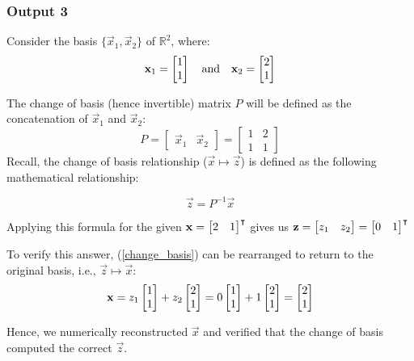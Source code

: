 \documentclass[10pt]{article}
\begin{document}
\subsubsection{Output 3}
Consider the basis $\{\vec{x}_1, \vec{x}_2\}$ of $\mathbb{R}^2$, where:
\begin{equation*}
    \mathbf{x}_1 = \begin{bmatrix} 1\\1 \end{bmatrix}
    \quad
    \text{and}
    \quad
    \mathbf{x}_2 = \begin{bmatrix} 2\\1 \end{bmatrix}
\end{equation*}

The change of basis (hence invertible) matrix $P$ will be defined as the concatenation of $\vec{x}_1$ and $\vec{x}_2$:
\begin{equation*}
    P =
        \begin{bmatrix}
            \vec{x}_1 & \vec{x}_2
        \end{bmatrix} = 
        \begin{bmatrix}
            1 & 2\\1 & 1
        \end{bmatrix}
\end{equation*}
Recall, the change of basis relationship ($\vec{x} \mapsto \vec{z} $)  is defined as the following mathematical relationship:

\begin{equation} \label{change_basis}
    \vec{z} = P^{-1} \vec{x}
\end{equation}

Applying this formula for the given $\mathbf{x} = \begin{bmatrix} 2 & 1 \end{bmatrix}^\intercal$ gives us $\mathbf{z} = \begin{bmatrix} z_1 & z_2 \end{bmatrix} = \begin{bmatrix} 0 & 1 \end{bmatrix}^\intercal$

To verify this answer, (\ref{change_basis}) can be rearranged to return to the original basis, i.e., $\vec{z} \mapsto \vec{x} $:
\begin{equation*}
    \mathbf{x} = z_1\begin{bmatrix} 1\\1 \end{bmatrix} + z_2\begin{bmatrix} 2\\1 \end{bmatrix} = 0\begin{bmatrix} 1\\1 \end{bmatrix} + 1\begin{bmatrix} 2\\1 \end{bmatrix} = \begin{bmatrix} 2\\1 \end{bmatrix}
\end{equation*}

Hence, we numerically reconstructed $\vec{x}$ and verified that the change of basis computed the correct $\vec{z}$.
\end{document}

